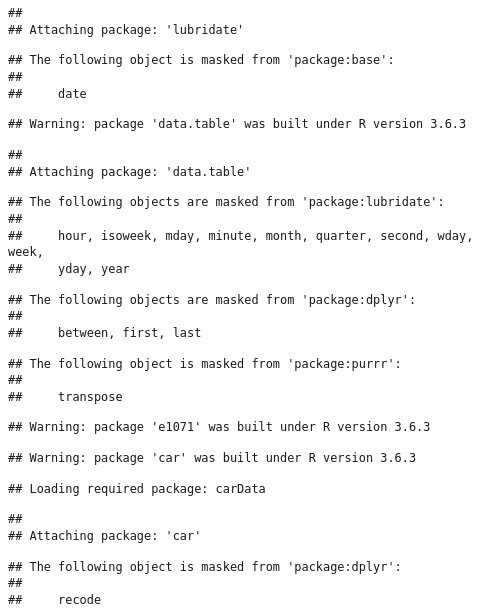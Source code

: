 \documentclass[
]{article}
\begin{document}
\begin{verbatim}
## 
## Attaching package: 'lubridate'
\end{verbatim}

\begin{verbatim}
## The following object is masked from 'package:base':
## 
##     date
\end{verbatim}

\begin{verbatim}
## Warning: package 'data.table' was built under R version 3.6.3
\end{verbatim}

\begin{verbatim}
## 
## Attaching package: 'data.table'
\end{verbatim}

\begin{verbatim}
## The following objects are masked from 'package:lubridate':
## 
##     hour, isoweek, mday, minute, month, quarter, second, wday, week,
##     yday, year
\end{verbatim}

\begin{verbatim}
## The following objects are masked from 'package:dplyr':
## 
##     between, first, last
\end{verbatim}

\begin{verbatim}
## The following object is masked from 'package:purrr':
## 
##     transpose
\end{verbatim}

\begin{verbatim}
## Warning: package 'e1071' was built under R version 3.6.3
\end{verbatim}

\begin{verbatim}
## Warning: package 'car' was built under R version 3.6.3
\end{verbatim}

\begin{verbatim}
## Loading required package: carData
\end{verbatim}

\begin{verbatim}
## 
## Attaching package: 'car'
\end{verbatim}

\begin{verbatim}
## The following object is masked from 'package:dplyr':
## 
##     recode
\end{verbatim}
\end{document}
